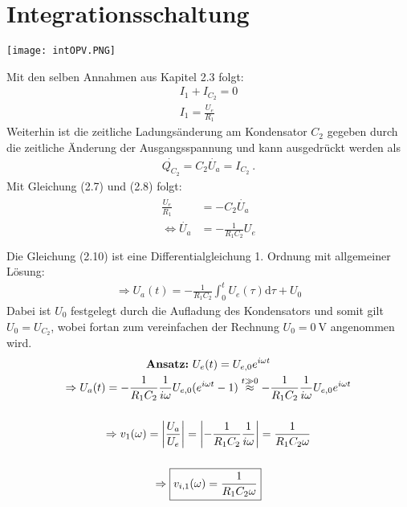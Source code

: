 \section{Integrationsschaltung}
\label{sec:intschaltung}
\begin{center}
    \texttt{[image: intOPV.PNG]} %
\end{center}
Mit den selben Annahmen aus Kapitel 2.3 folgt:
\begin{gather}
    I_1 + I_{C_2} = 0\\
    I_1 = \frac{U_e}{R_1}
\end{gather}
Weiterhin ist die zeitliche Ladungsänderung am Kondensator $C_2$ gegeben durch die zeitliche Änderung der Ausgangsspannung und kann ausgedrückt werden als
\begin{gather}
    \dot{Q_{C_2}} = C_2 \dot{U_a} = I_{C_2}~.
\end{gather}
Mit Gleichung (2.7) und (2.8) folgt:
\begin{gather}
    \begin{aligned}
        \frac{U_e}{R_1} &= -C_2 \dot{U_a}\\
        \Leftrightarrow \dot{U_a} &= -\frac{1}{R_1 C_2} U_e\\[0.5cm]
    \end{aligned}
\end{gather}
Die Gleichung (2.10) ist eine Differentialgleichung 1. Ordnung mit allgemeiner Lösung:
\begin{gather}
    \Rightarrow \boxed{U_a(t) = -\frac{1}{R_1 C_2} \int_0^t U_e(\tau)\text{d}\tau + U_0}
    \label{eq:integrierer}
\end{gather}
Dabei ist $U_0$ festgelegt durch die Aufladung des Kondensators und somit gilt $U_0 = U_{C_2}$, wobei fortan zum vereinfachen der Rechnung $U_0=0~\text{V}$ angenommen wird.\\
\begin{gather}
    \text{\textbf{Ansatz:}}~U_e(t) = U_{e,0}e^{i\omega t}\\
    \Rightarrow U_a(t) = -\frac{1}{R_1 C_2} \frac{1}{i\omega} U_{e,0}(e^{i\omega t}-1) \overset{t \gg 0}{\approx} -\frac{1}{R_1 C_2} \frac{1}{i\omega} U_{e,0}e^{i\omega t}\\[0.5cm]
    \Rightarrow v_{1}(\omega) = \abs{\frac{U_a}{U_e}} = \abs{-\frac{1}{R_1 C_2} \frac{1}{i\omega}} = \frac{1}{R_1 C_2 \omega}\\[0.5cm]
    \Rightarrow \boxed{v_{i,1}(\omega)=\frac{1}{R_1 C_2 \omega}}
\end{gather}
